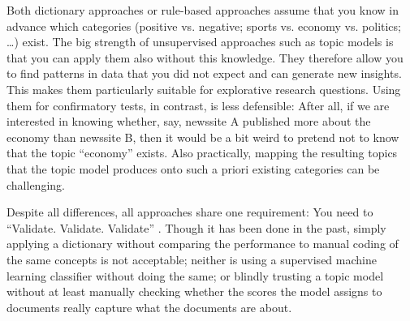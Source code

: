 Both dictionary approaches or rule-based approaches assume that you
know in advance which categories (positive vs. negative; sports
vs. economy vs. politics; \ldots) exist. The big strength of unsupervised
approaches such as topic models is that you can apply them also
without this knowledge. They therefore allow you to find patterns
in data that you did not expect and can generate new insights. This
makes them particularly suitable for explorative research questions.
Using them for confirmatory tests, in contrast, is less defensible:
After all, if we are interested in knowing whether, say, newssite A
published more about the economy than newssite B, then it would be
a bit weird to pretend not to know that the topic ``economy'' exists.
Also practically, mapping the resulting topics that the topic model
produces onto such a priori existing categories can be challenging.

Despite all differences, all approaches share one requirement: You
need to ``Validate. Validate. Validate'' \citep{Grimmer2013}. Though
it has been done in the past, simply applying a dictionary without
comparing the performance to manual coding of the same concepts
is not acceptable; neither is using a supervised machine learning
classifier without doing the same; or blindly trusting a topic model
without at least manually checking whether the scores the model assigns
to documents really capture what the documents are about.


